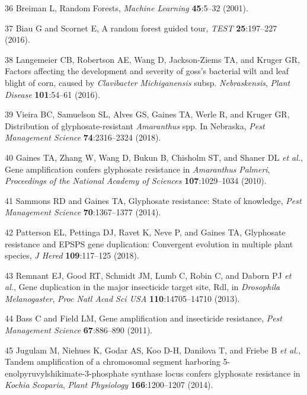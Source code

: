 \documentclass[
  12pt,
  a4paper]{article}
\begin{document}
\leavevmode\hypertarget{ref-breiman_random_2001}{}%
36 Breiman L, Random Forests, \emph{Machine Learning} \textbf{45}:5--32
(2001).

\leavevmode\hypertarget{ref-biau_random_2016}{}%
37 Biau G and Scornet E, A random forest guided tour, \emph{TEST}
\textbf{25}:197--227 (2016).

\leavevmode\hypertarget{ref-langemeier_factors_2016}{}%
38 Langemeier CB, Robertson AE, Wang D, Jackson-Ziems TA, and Kruger GR,
Factors affecting the development and severity of goss's bacterial wilt
and leaf blight of corn, caused by \emph{Clavibacter}
\emph{Michiganensis} subsp. \emph{Nebraskensis}, \emph{Plant Disease}
\textbf{101}:54--61 (2016).

\leavevmode\hypertarget{ref-vieira_distribution_2018}{}%
39 Vieira BC, Samuelson SL, Alves GS, Gaines TA, Werle R, and Kruger GR,
Distribution of glyphosate-resistant \emph{Amaranthus} spp. In Nebraska,
\emph{Pest Management Science} \textbf{74}:2316--2324 (2018).

\leavevmode\hypertarget{ref-gaines_gene_2010}{}%
40 Gaines TA, Zhang W, Wang D, Bukun B, Chisholm ST, and Shaner DL
\emph{et al.}, Gene amplification confers glyphosate resistance in
\emph{Amaranthus} \emph{Palmeri}, \emph{Proceedings of the National
Academy of Sciences} \textbf{107}:1029--1034 (2010).

\leavevmode\hypertarget{ref-sammons_glyphosate_2014}{}%
41 Sammons RD and Gaines TA, Glyphosate resistance: State of knowledge,
\emph{Pest Management Science} \textbf{70}:1367--1377 (2014).

\leavevmode\hypertarget{ref-patterson_glyphosate_2018}{}%
42 Patterson EL, Pettinga DJ, Ravet K, Neve P, and Gaines TA, Glyphosate
resistance and EPSPS gene duplication: Convergent evolution in multiple
plant species, \emph{J Hered} \textbf{109}:117--125 (2018).

\leavevmode\hypertarget{ref-remnant_gene_2013}{}%
43 Remnant EJ, Good RT, Schmidt JM, Lumb C, Robin C, and Daborn PJ
\emph{et al.}, Gene duplication in the major insecticide target site,
Rdl, in \emph{Drosophila} \emph{Melanogaster}, \emph{Proc Natl Acad Sci
USA} \textbf{110}:14705--14710 (2013).

\leavevmode\hypertarget{ref-bass_gene_2011}{}%
44 Bass C and Field LM, Gene amplification and insecticide resistance,
\emph{Pest Management Science} \textbf{67}:886--890 (2011).

\leavevmode\hypertarget{ref-jugulam_tandem_2014}{}%
45 Jugulam M, Niehues K, Godar AS, Koo D-H, Danilova T, and Friebe B
\emph{et al.}, Tandem amplification of a chromosomal segment harboring
5-enolpyruvylshikimate-3-phosphate synthase locus confers glyphosate
resistance in \emph{Kochia} \emph{Scoparia}, \emph{Plant Physiology}
\textbf{166}:1200--1207 (2014).
\end{document}
